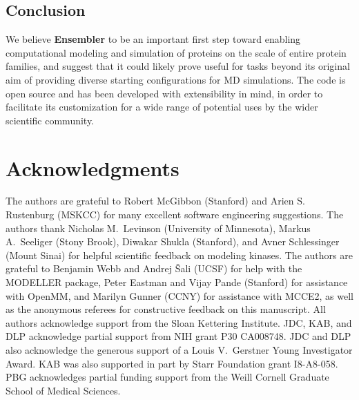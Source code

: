 \documentclass[aps,prl,preprint,nofootinbib,superscriptaddress,linenumbers]{revtex4-1}
\begin{document}
\subsection*{Conclusion}

We believe {\bf Ensembler} to be an important first step toward enabling computational modeling and simulation of proteins on the scale of entire protein families, and suggest that it could likely prove useful for tasks beyond its original aim of providing diverse starting configurations for MD simulations.
The code is open source and has been developed with extensibility in mind, in order to facilitate its customization for a wide range of potential uses by the wider scientific community.


\section{Acknowledgments}
\label{section:acknowledgments}

The authors are grateful to Robert McGibbon (Stanford) and Arien S. Rustenburg (MSKCC) for many excellent software engineering suggestions.
The authors thank Nicholas M.~Levinson (University of Minnesota), Markus A.~Seeliger (Stony Brook), Diwakar Shukla (Stanford), and Avner Schlessinger (Mount Sinai) for helpful scientific feedback on modeling kinases.
The authors are grateful to Benjamin Webb and Andrej \v{S}ali (UCSF) for help with the MODELLER package, Peter Eastman and Vijay Pande (Stanford) for assistance with OpenMM, and Marilyn Gunner (CCNY) for assistance with MCCE2, as well as the anonymous referees for constructive feedback on this manuscript.
All authors acknowledge support from the Sloan Kettering Institute.
JDC, KAB, and DLP acknowledge partial support from NIH grant P30 CA008748.
JDC and DLP also acknowledge the generous support of a Louis V.~Gerstner Young Investigator Award.
KAB was also supported in part by Starr Foundation grant I8-A8-058.
PBG acknowledges partial funding support from the Weill Cornell Graduate School of Medical Sciences.

\end{document}
